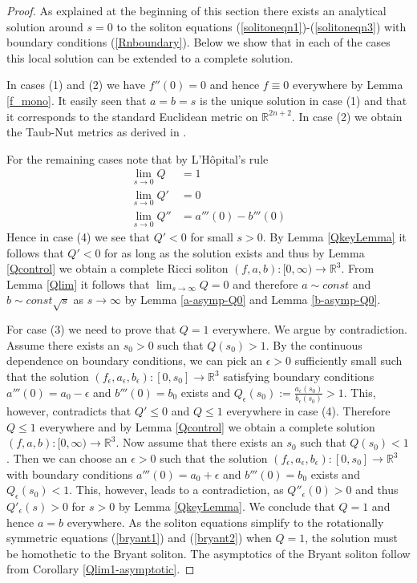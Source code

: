 \documentclass{amsart}
\theoremstyle{definition}
\theoremstyle{remark}
\numberwithin{equation}{section}
\newcommand{\R}{\mathbb{R}}  %
\begin{document}
\begin{proof}
As explained at the beginning of this section there exists an analytical solution around $s=0$ to the soliton equations (\ref{solitoneqn1})-(\ref{solitoneqn3}) with boundary conditions (\ref{Rnboundary}). Below we show that in each of the cases this local solution can be extended to a complete solution. 

In cases (1) and (2) we have $f''(0) = 0$ and hence $f\equiv0$ everywhere by Lemma \ref{f_mono}. It easily seen that $a = b = s$ is the unique solution in case (1) and that it corresponds to the standard Euclidean metric on $\R^{2n+2}$. In case (2) we obtain the Taub-Nut metrics as derived in \cite{AG03}. 

For the remaining cases note that by L'H\^opital's rule 
\begin{align*}
\lim_{s \rightarrow 0} Q  &= 1 \\
\lim_{s \rightarrow 0} Q'  &= 0 \\
\lim_{s \rightarrow 0} Q''  &= a'''(0) - b'''(0)
\end{align*}
Hence in case (4) we see that $Q'<0$ for small $s>0$. By Lemma \ref{QkeyLemma} it follows that $Q'<0$ for as long as the solution exists and thus by Lemma \ref{Qcontrol} we obtain a complete Ricci soliton $(f,a,b): [0,\infty) \rightarrow \R^3$. From Lemma \ref{Qlim} it follows that $\lim_{s\rightarrow\infty} Q = 0$ and therefore $a \sim const$ and $b\sim const \sqrt{s}$ as $s\rightarrow \infty$ by Lemma \ref{a-asymp-Q0} and Lemma \ref{b-asymp-Q0}.

For case (3) we need to prove that $Q=1$ everywhere. We argue by contradiction. Assume there exists an $s_0 >0$ such that $Q(s_0) > 1$. By the continuous dependence on boundary conditions, we can pick an $\epsilon>0$ sufficiently small such that the solution $(f_{\epsilon}, a_{\epsilon}, b_{\epsilon}): [0,s_0] \rightarrow \R^3$ satisfying boundary conditions $a'''(0) = a_0 - \epsilon$ and $b'''(0) = b_0$ exists and $Q_{\epsilon}(s_0):=\frac{a_{\epsilon}(s_0)}{b_{\epsilon}(s_0)} > 1$. This, however, contradicts that $Q' \leq 0$ and $Q \leq 1$ everywhere in case (4). Therefore $Q\leq1$ everywhere and by Lemma \ref{Qcontrol} we obtain a complete solution $(f,a,b): [0,\infty) \rightarrow \R^3$. Now assume that there exists an $s_0$ such that $Q(s_0) < 1$. Then we can choose an $\epsilon >0$ such that the solution $(f_{\epsilon}, a_{\epsilon}, b_{\epsilon}): [0,s_0] \rightarrow \R^3$ with boundary conditions $a'''(0) = a_0 + \epsilon$ and $b'''(0) = b_0$ exists and $Q_{\epsilon}(s_0) < 1$. This, however, leads to a contradiction, as $Q''_{\epsilon}(0) > 0$ and thus $Q'_{\epsilon}(s) >0$ for $s>0$ by Lemma \ref{QkeyLemma}. We conclude that $Q=1$ and hence $a=b$ everywhere. As the soliton equations simplify to the rotationally symmetric equations (\ref{bryant1}) and (\ref{bryant2}) when $Q=1$, the solution must be homothetic to the Bryant soliton. The asymptotics of the Bryant soliton follow from Corollary \ref{Qlim1-asymptotic}.
\end{proof}
\end{document}
